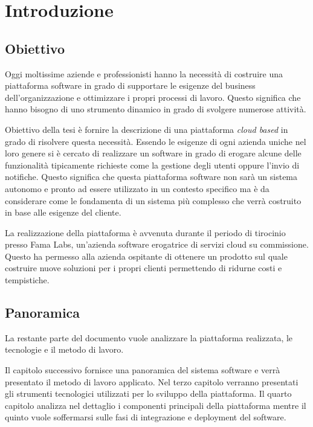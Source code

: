\chapter{Introduzione}
\section{Obiettivo}
Oggi moltissime aziende e professionisti hanno la necessità di costruire
una piattaforma software in grado di supportare le esigenze del business dell'organizzazione e
ottimizzare i propri processi di lavoro. Questo significa che hanno bisogno di uno strumento dinamico
in grado di svolgere numerose attività.

Obiettivo della tesi è fornire la descrizione di una piattaforma \textit{cloud based} in grado di risolvere questa necessità.
Essendo le esigenze di ogni azienda uniche nel loro genere si è cercato di realizzare un software in grado
di erogare alcune delle funzionalità tipicamente richieste come la gestione degli utenti oppure l'invio di notifiche.
Questo significa che questa piattaforma software non sarà un sistema autonomo e pronto ad essere utilizzato in un contesto specifico ma
è da considerare come le fondamenta di un sistema più complesso che verrà costruito in base alle esigenze del cliente.

La realizzazione della piattaforma è avvenuta durante il periodo di tirocinio presso Fama Labs,
un'azienda software erogatrice di servizi cloud su commissione.
Questo ha permesso alla azienda ospitante di ottenere un prodotto sul quale costruire nuove soluzioni per i propri clienti
permettendo di ridurne costi e tempistiche.

\section{Panoramica}
La restante parte del documento vuole analizzare la piattaforma realizzata, le tecnologie e il metodo di lavoro.

Il capitolo successivo fornisce una panoramica del sistema software
e verrà presentato il metodo di lavoro applicato. Nel terzo capitolo verranno presentati
gli strumenti tecnologici utilizzati per lo sviluppo della piattaforma. Il quarto capitolo
analizza nel dettaglio i componenti principali della piattaforma mentre il quinto
vuole soffermarsi sulle fasi di integrazione e deployment del software.
